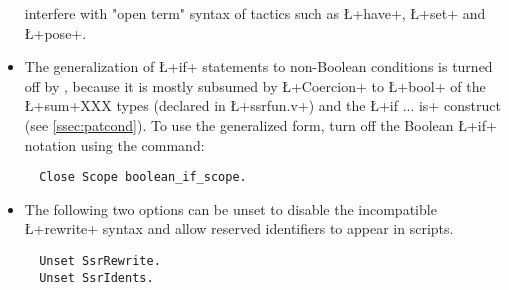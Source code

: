 \begin{itemize}
interfere with "open term" syntax of tactics such as \L+have+, \L+set+
and \L+pose+.
\item The generalization of \L+if+ statements to non-Boolean
conditions is turned off by \ssr{}, because it is mostly subsumed by
\L+Coercion+ to \L+bool+ of the \L+sum+XXX types (declared in
\L+ssrfun.v+) and the \L+if ... is+ construct (see
\ref{ssec:patcond}). To use the generalized form, turn off the \ssr{}
Boolean \L+if+ notation using the command:
\begin{lstlisting}
  Close Scope boolean_if_scope.
\end{lstlisting}
\item The following two options can be unset to disable the
      incompatible \L+rewrite+ syntax and allow
      reserved identifiers to appear in scripts.
\begin{lstlisting}
  Unset SsrRewrite.
  Unset SsrIdents.
\end{lstlisting}
\end{itemize}

